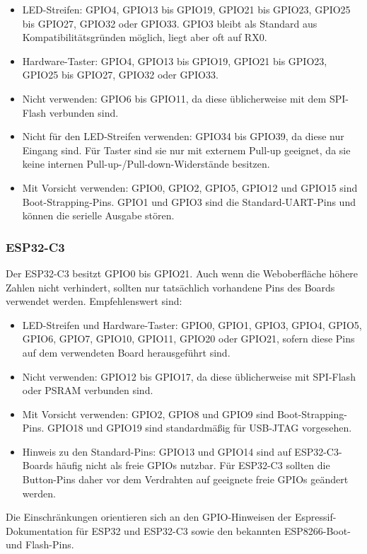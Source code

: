 \documentclass[12pt,a4paper, german,oneside, headinclude, headsepline,plainheadsepline,BCOR20mm, DIV18,parskip=half, openright, numbers=noenddot, captions=tableheading,version=first,listof=totoc,version=first]{scrbook}
\begin{document}
\begin{itemize}
    \item LED-Streifen: GPIO4, GPIO13 bis GPIO19, GPIO21 bis GPIO23, GPIO25 bis GPIO27, GPIO32 oder GPIO33. GPIO3 bleibt als Standard aus Kompatibilitätsgründen möglich, liegt aber oft auf RX0.
    \item Hardware-Taster: GPIO4, GPIO13 bis GPIO19, GPIO21 bis GPIO23, GPIO25 bis GPIO27, GPIO32 oder GPIO33.
    \item Nicht verwenden: GPIO6 bis GPIO11, da diese üblicherweise mit dem SPI-Flash verbunden sind.
    \item Nicht für den LED-Streifen verwenden: GPIO34 bis GPIO39, da diese nur Eingang sind. Für Taster sind sie nur mit externem Pull-up geeignet, da sie keine internen Pull-up-/Pull-down-Widerstände besitzen.
    \item Mit Vorsicht verwenden: GPIO0, GPIO2, GPIO5, GPIO12 und GPIO15 sind Boot-Strapping-Pins. GPIO1 und GPIO3 sind die Standard-UART-Pins und können die serielle Ausgabe stören.
\end{itemize}

\subsubsection{ESP32-C3}

Der ESP32-C3 besitzt GPIO0 bis GPIO21. Auch wenn die Weboberfläche höhere Zahlen nicht verhindert, sollten nur tatsächlich vorhandene Pins des Boards verwendet werden. Empfehlenswert sind:

\begin{itemize}
    \item LED-Streifen und Hardware-Taster: GPIO0, GPIO1, GPIO3, GPIO4, GPIO5, GPIO6, GPIO7, GPIO10, GPIO11, GPIO20 oder GPIO21, sofern diese Pins auf dem verwendeten Board herausgeführt sind.
    \item Nicht verwenden: GPIO12 bis GPIO17, da diese üblicherweise mit SPI-Flash oder PSRAM verbunden sind.
    \item Mit Vorsicht verwenden: GPIO2, GPIO8 und GPIO9 sind Boot-Strapping-Pins. GPIO18 und GPIO19 sind standardmäßig für USB-JTAG vorgesehen.
    \item Hinweis zu den Standard-Pins: GPIO13 und GPIO14 sind auf ESP32-C3-Boards häufig nicht als freie GPIOs nutzbar. Für ESP32-C3 sollten die Button-Pins daher vor dem Verdrahten auf geeignete freie GPIOs geändert werden.
\end{itemize}

Die Einschränkungen orientieren sich an den GPIO-Hinweisen der Espressif-Dokumentation für ESP32 und ESP32-C3 sowie den bekannten ESP8266-Boot- und Flash-Pins.
\end{document}
